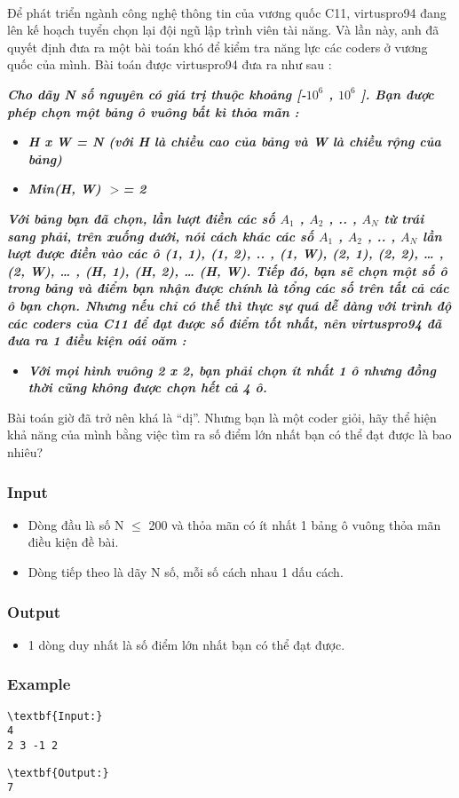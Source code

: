 

 

Để phát triển ngành công nghệ thông tin của vương quốc C11, virtuspro94 đang lên kế hoạch tuyển chọn lại đội ngũ lập trình viên tài năng. Và lần này, anh đã quyết định đưa ra một bài toán khó để kiểm tra năng lực các coders ở vương quốc của mình. Bài toán được virtuspro94 đưa ra như sau :

\emph{\textbf{Cho dãy N số nguyên có giá trị thuộc khoảng [-$10^{6}$ , $10^{6}$ ]. Bạn được phép chọn một bảng ô vuông bất kì thỏa mãn : }}
\begin{itemize}
	\item \emph{\textbf{H x W = N (với H là chiều cao của bảng và W là chiều rộng của bảng) }}
	\item \emph{\textbf{Min(H, W) $>$= 2 }}
\end{itemize}

\emph{\textbf{Với bảng bạn đã chọn, lần lượt điền các số $A_{1}$ , $A_{2}$ , .. , $A_{N}$ từ trái sang phải, trên xuống dưới, nói cách khác các số $A_{1}$ , $A_{2}$ , .. , $A_{N}$ lần lượt được điền vào các ô (1, 1), (1, 2), .. , (1, W), (2, 1), (2, 2), … , (2, W), … , (H, 1), (H, 2), … (H, W). Tiếp đó, bạn sẽ chọn một số ô trong bảng và điểm bạn nhận được chính là tổng các số trên tất cả các ô bạn chọn. Nhưng nếu chỉ có thế thì thực sự quá dễ dàng với trình độ các coders của C11 để đạt được số điểm tốt nhất, nên virtuspro94 đã đưa ra 1 điều kiện oái oăm : }}
\begin{itemize}
	\item \emph{\textbf{Với mọi hình vuông 2 x 2, bạn phải chọn ít nhất 1 ô nhưng đồng thời cũng không được chọn hết cả 4 ô. }}
\end{itemize}

Bài toán giờ đã trở nên khá là “dị”. Nhưng bạn là một coder giỏi, hãy thể hiện khả năng của mình bằng việc tìm ra số điểm lớn nhất bạn có thể đạt được là bao nhiêu?

\subsubsection{Input}
\begin{itemize}
	\item Dòng đầu là số N  $\le$  200 và thỏa mãn có ít nhất 1 bảng ô vuông thỏa mãn điều kiện đề bài.
	\item Dòng tiếp theo là dãy N số, mỗi số cách nhau 1 dấu cách.
\end{itemize}

\subsubsection{Output}
\begin{itemize}
	\item 1 dòng duy nhất là số điểm lớn nhất bạn có thể đạt được.
\end{itemize}

\subsubsection{Example}
\begin{verbatim}
\textbf{Input:}
4
2 3 -1 2\end{verbatim}
\begin{verbatim}
\textbf{Output:}
7\end{verbatim}
